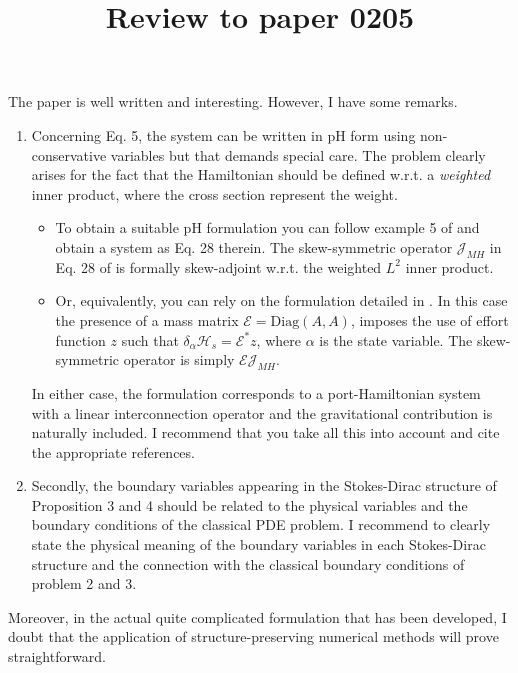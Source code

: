 \documentclass[a4paper, 10pt]{article}
\title{Review to paper 0205}
\begin{document}
	\maketitle
	
	The paper is well written and interesting. 
	However, I have some remarks. 
	\begin{enumerate}
		\item Concerning Eq. 5, the system can be written in pH form using non-conservative variables but that demands special care. The problem clearly arises for the fact that the Hamiltonian should be defined w.r.t. a \textit{weighted} inner product, where the cross section represent the weight. 
		\begin{itemize}
			\item To obtain a suitable pH formulation you can follow example 5 of \cite{MATIGNONdamp} and obtain a system as Eq. 28 therein. The skew-symmetric operator $\mathcal{J}_{MH}$ in Eq. 28 of \cite{MATIGNONdamp} is formally skew-adjoint w.r.t. the weighted $L^2$ inner product. 
			\item Or, equivalently, you can  rely on the formulation detailed in \cite{mehrmann2019structurepreserving}. In this case the presence of a mass matrix $\mathcal{E} = \mathrm{Diag}(A, A)$, imposes the use of effort function $z$ such that $\delta_\alpha \mathcal{H}_s = \mathcal{E}^* z$, where $\alpha$ is the state variable. The skew-symmetric operator is simply $\mathcal{E} \mathcal{J}_{MH}$. 
		\end{itemize}
		In either case, the formulation corresponds to a port-Hamiltonian system with a linear interconnection operator and the gravitational contribution is naturally included. I recommend that you take all this into account and cite the appropriate references. 
		\item Secondly, the boundary variables appearing in the Stokes-Dirac structure of Proposition 3 and 4 should be related to the physical variables and the boundary conditions of the classical PDE problem. I recommend to clearly state the physical meaning  of the boundary variables in each Stokes-Dirac structure and the connection with the classical boundary conditions of problem 2 and 3.
	\end{enumerate}
	
	Moreover, in the actual quite complicated formulation that has been developed, I doubt that the application of structure-preserving numerical methods will prove straightforward.
	
	
	
	

	
\end{document}
